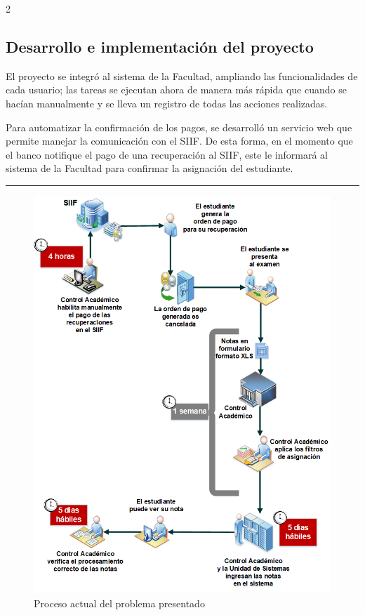 \documentclass[11pt,spanish,Letterpaper,openany]{book}
\begin{document}
\begin {multicols}{2}
\hypertarget{desarrollo-e-implementacion-del-proyecto}{%
\subsection{Desarrollo e implementación del proyecto}\label{desarrollo-e-implementacion-del-proyecto}}

El proyecto se integró al sistema de la Facultad, ampliando las funcionalidades de cada usuario; las tareas se ejecutan ahora de manera más rápida que cuando se hacían manualmente y se lleva un registro de todas las acciones realizadas.

Para automatizar la confirmación de los pagos, se desarrolló un servicio web que permite manejar la comunicación con el SIIF. De esta forma, en el momento que el banco notifique el pago de una recuperación al SIIF, este le informará al sistema de la Facultad para confirmar la asignación del estudiante.

\end {multicols}

\begin{center}\rule{0.5\linewidth}{\linethickness}\end{center}

\begin{figure}[H]

{\centering \includegraphics[width=0.75\linewidth]{images/201901-rherrera-imagen01} 

}

\caption{Proceso actual del problema presentado }\label{fig:unnamed-chunk-30}
\end{figure}
\end{document}
